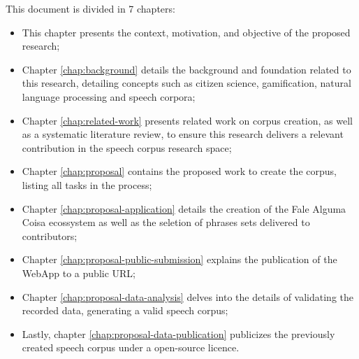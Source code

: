 This document is divided in 7 chapters:

\begin{itemize}
    \item This chapter presents the context, motivation, and objective of the proposed research;
    \item Chapter \ref{chap:background} details the background and foundation related to this research, detailing concepts such as citizen science, gamification, natural language processing and speech corpora;
    \item Chapter \ref{chap:related-work} presents related work on corpus creation, as well as a systematic literature review, to ensure this research delivers a relevant contribution in the speech corpus research space;
    \item Chapter \ref{chap:proposal} contains the proposed work to create the corpus, listing all tasks in the process;
    \item Chapter \ref{chap:proposal-application} details the creation of the Fale Alguma Coisa ecossystem as well as the seletion of phrases sets delivered to contributors;
    \item Chapter \ref{chap:proposal-public-submission} explains the publication of the WebApp to a public URL;
    \item Chapter \ref{chap:proposal-data-analysis} delves into the details of validating the recorded data, generating a valid speech corpus;
    \item Lastly, chapter \ref{chap:proposal-data-publication} publicizes the previously created speech corpus under a open-source licence.
\end{itemize}
